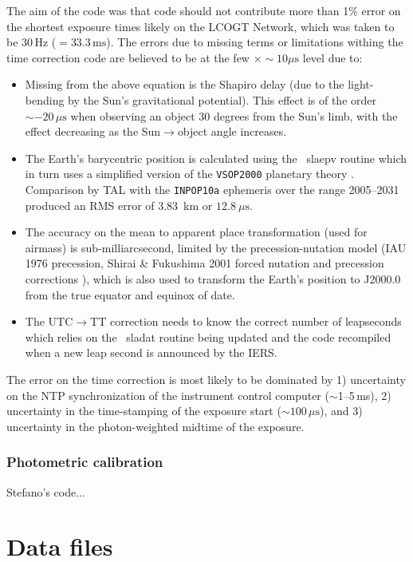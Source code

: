 \documentclass[twoside,11pt]{article}
\newcommand{\xref}[3]{#1}
\renewcommand{\_}{\texttt{\symbol{95}}}
\newcommand{\SLALIB}{\xref{{\sc{SLALIB}}}{sun67}{}}
\newcommand{\task}[1]{\textsf{#1}}
\newcommand{\LCONet}{LCOGT Network}
\newcommand{\rmn}[1] {\mathrm{#1}}
\begin{document}
The aim of the code was that code should not contribute more than 1\% error on
the shortest exposure times likely on the \LCONet, which was taken to be 30\,Hz
($=33.3\,\rmn{ms}$). The errors due to missing terms or limitations withing the
time correction code are believed to be at the few $\times\sim10\mu\rmn{s}$
level due to:
\begin{itemize}
\item Missing from the above equation is the Shapiro delay (due to the light-bending
by the Sun's gravitational potential). This effect is of the order $\sim-20\,\mu\rmn{s}$
when observing an object 30 degrees from the Sun's limb, with the effect decreasing as the
Sun$\rightarrow$object angle increases.
\item The Earth's barycentric position is calculated using the \SLALIB\
\task{sla\_epv} routine which in turn uses a simplified version of the
\texttt{VSOP2000} planetary theory \cite{vsop2000}. Comparison by TAL with the
\texttt{INPOP10a} ephemeris \cite{inpop10a} over the range 2005--2031 produced
an RMS error of 3.83\ km or $12.8\ \mu\rmn{s}$.
\item The accuracy on the mean to apparent place transformation (used for
airmass) is sub-milliarcsecond, limited by the precession-nutation model (IAU
1976 precession, Shirai \& Fukushima 2001 forced nutation and precession
corrections \cite{sf2001}), which is also used to transform the Earth's position to
J2000.0 from the true equator and equinox of date.
\item The $\rmn{UTC}\rightarrow\rmn{TT}$ correction needs to know the correct
number of leapseconds which relies on the \SLALIB\ \task{sla\_dat} routine being
updated and the code recompiled when a new leap second is announced by the IERS.
\end{itemize}

The error on the time correction is most likely to be dominated by 1)
uncertainty on the NTP synchronization of the instrument control computer
($\sim$1--5\,ms), 2) uncertainty in the time-stamping of the exposure start
($\sim 100\,\mu\rmn{s}$), and 3) uncertainty in the photon-weighted midtime of the
exposure.

\subsubsection{Photometric calibration}
Stefano's code...

\section{Data files}
\end{document}
